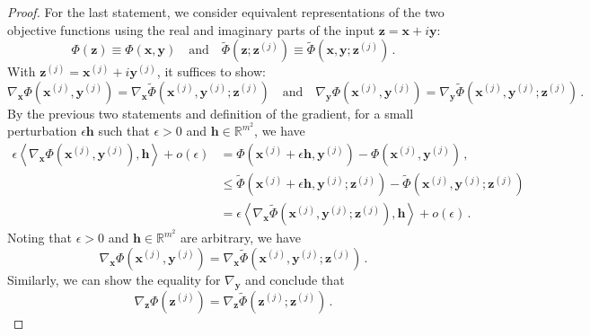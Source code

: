 \documentclass{article}
\numberwithin{equation}{section}
\begin{document}
\begin{proof}
     For the last statement, we consider equivalent representations of the two objective functions using the real and imaginary parts of the input $\bm{z}=\bm{x}+i\bm{y}$: 
     \begin{equation*}
         \Phi\left(\bm{z}\right) \equiv \Phi\left(\bm{x},\bm{y}\right)\quad\text{and}\quad \widetilde{\Phi}\left(\bm{z};\bm{z}^{(j)}\right) \equiv \widetilde{\Phi}\left(\bm{x},\bm{y};\bm{z}^{(j)}\right)\,.
     \end{equation*}
    With $\bm{z}^{(j)}=\bm{x}^{(j)}+i\bm{y}^{(j)}$, it suffices to show:
    \begin{equation*}
        \nabla_{\bm{x}}\Phi\left(\bm{x}^{(j)},\bm{y}^{(j)}\right) = \nabla_{\bm{x}}\widetilde{\Phi}\left(\bm{x}^{(j)},\bm{y}^{(j)};\bm{z}^{(j)}\right)\quad\text{and}\quad \nabla_{\bm{y}}\Phi\left(\bm{x}^{(j)},\bm{y}^{(j)}\right) = \nabla_{\bm{y}}\widetilde{\Phi}\left(\bm{x}^{(j)},\bm{y}^{(j)};\bm{z}^{(j)}\right)\,.
    \end{equation*}
    By the previous two statements and definition of the gradient, for a small perturbation $\epsilon \bm{h}$ such that $\epsilon > 0$ and $\bm{h}\in\mathbb{R}^{m^2}$, we have
    \begin{equation*}
        \begin{aligned}
            \epsilon\left\langle\nabla_{\bm{x}}\Phi\left(\bm{x}^{(j)},\bm{y}^{(j)}\right),\bm{h}\right\rangle+o(\epsilon)&= \Phi\left(\bm{x}^{(j)}+\epsilon \bm{h},\bm{y}^{(j)}\right)-\Phi\left(\bm{x}^{(j)},\bm{y}^{(j)}\right)\,,\\
            &\leq \widetilde{\Phi}\left(\bm{x}^{(j)}+\epsilon\bm{h},\bm{y}^{(j)};\bm{z}^{(j)}\right)-\widetilde{\Phi}\left(\bm{x}^{(j)},\bm{y}^{(j)};\bm{z}^{(j)}\right)\\
            &=\epsilon\left\langle\nabla_{\bm{x}}\widetilde{\Phi}\left(\bm{x}^{(j)},\bm{y}^{(j)};\bm{z}^{(j)}\right),\bm{h}\right\rangle+o(\epsilon)\,.
        \end{aligned}
    \end{equation*}
    Noting that $\epsilon > 0$ and $\bm{h}\in\mathbb{R}^{m^2}$ are arbitrary, we have
    \begin{equation*}
        \nabla_{\bm{x}}\Phi\left(\bm{x}^{(j)},\bm{y}^{(j)}\right) = \nabla_{\bm{x}}\widetilde{\Phi}\left(\bm{x}^{(j)},\bm{y}^{(j)};\bm{z}^{(j)}\right)\,.
    \end{equation*}
    Similarly, we can show the equality for $\nabla_{\bm{y}}$ and conclude that 
    \begin{equation*}
        \nabla_{\bm{z}}\Phi\left(\bm{z}^{(j)}\right) = \nabla_{\bm{z}}\widetilde{\Phi}\left(\bm{z}^{(j)};\bm{z}^{(j)}\right)\,.
    \end{equation*}
\end{proof}
\end{document}
